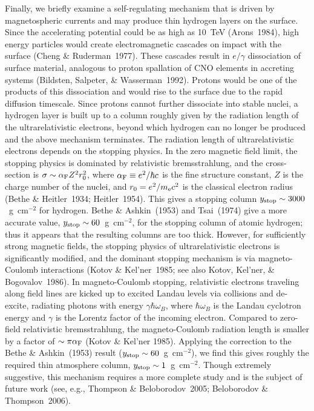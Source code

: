 \documentclass[useAMS,usegraphicx]{mn2e}
\begin{document}
Finally, we briefly examine a self-regulating mechanism that is driven by
magnetospheric currents and may produce thin hydrogen layers on the
surface.  Since the accelerating potential could be as high as 10~TeV
(Arons~1984), high energy particles would create electromagnetic
cascades on impact with the surface (Cheng \& Ruderman~1977).  These
cascades result in $e/\gamma$ dissociation of surface material,
analogous to proton spallation of CNO elements in accreting systems (Bildsten,
Salpeter, \& Wasserman~1992).  Protons would be one of the products of
this dissociation and would rise to the surface due to the rapid
diffusion timescale.  Since protons cannot further dissociate into
stable nuclei, a hydrogen layer is built up to a column roughly given
by the radiation length of the ultrarelativistic electrons, beyond
which hydrogen can no longer be produced and the above mechanism
terminates.  The radiation length of ultrarelativistic electrons
depends on the stopping physics. In the zero magnetic field limit, the
stopping physics is dominated by relativistic bremsstrahlung, and the
cross-section is $\sigma\sim\alpha_{\rm F} Z^2 r_0^2$, where
$\alpha_{\rm F}\equiv e^2/\hbar c$ is the fine structure constant, $Z$
is the charge number of the nuclei, and $r_0=e^2/m_{\rm e}c^2$ is the
classical electron radius (Bethe \& Heitler~1934; Heitler~1954).  This
gives a stopping column $y_{\rm stop}\sim 3000$~g~cm$^{-2}$ for
hydrogen.  Bethe \& Ashkin~(1953) and Tsai~(1974) give a more accurate
value, $y_{\rm stop}\sim 60$~g~cm$^{-2}$, for the stopping column of
atomic hydrogen; thus it appears that the resulting columns are too
thick.  However, for sufficiently strong magnetic fields, the stopping
physics of ultrarelativistic electrons is significantly modified, and
the dominant stopping mechanism is via magneto-Coulomb interactions
(Kotov \& Kel'ner~1985; see also Kotov, Kel'ner, \& Bogovalov~1986).
In magneto-Coulomb stopping, relativistic electrons traveling along
field lines are kicked up to excited Landau levels via collisions and
de-excite, radiating photons with energy $\gamma\hbar\omega_B$, where
$\hbar\omega_B$ is the Landau cyclotron energy and $\gamma$ is the
Lorentz factor of the incoming electron.  Compared to zero-field
relativistic bremsstrahlung, the magneto-Coulomb radiation length is
smaller by a factor of $\sim\pi\alpha_{\rm F}$ (Kotov \& Kel'ner
1985).  Applying the correction to the Bethe \& Ashkin~(1953) result
($y_{\rm stop}\sim 60$~g~cm$^{-2}$), we find this gives roughly the
required thin atmosphere column, $y_{\rm stop}\sim 1$~g~cm$^{-2}$.
Though extremely suggestive, this mechanism requires a more complete
study and is the subject of future work
(see, e.g., Thompson \& Beloborodov~2005; Beloborodov \& Thompson~2006).
\end{document}
